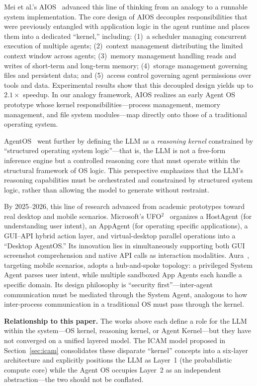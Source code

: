 \documentclass[11pt,a4paper]{article}
\begin{document}
Mei et al.'s AIOS~\cite{mei2024aios} advanced this line of thinking from an analogy to a runnable system implementation.
The core design of AIOS decouples responsibilities that were previously entangled with application logic in the agent runtime and places them into a dedicated ``kernel,'' including:
(1)~a scheduler managing concurrent execution of multiple agents;
(2)~context management distributing the limited context window across agents;
(3)~memory management handling reads and writes of short-term and long-term memory;
(4)~storage management governing files and persistent data; and
(5)~access control governing agent permissions over tools and data.
Experimental results show that this decoupled design yields up to $2.1\times$ speedup.
In our analogy framework, AIOS realizes an early Agent OS prototype whose kernel responsibilities---process management, memory management, and file system modules---map directly onto those of a traditional operating system.

AgentOS~\cite{agentos2025} went further by defining the LLM as a \textit{reasoning kernel} constrained by ``structured operating system logic''---that is, the LLM is not a free-form inference engine but a controlled reasoning core that must operate within the structural framework of OS logic.
This perspective emphasizes that the LLM's reasoning capabilities must be orchestrated and constrained by structured system logic, rather than allowing the model to generate without restraint.

By 2025--2026, this line of research advanced from academic prototypes toward real desktop and mobile scenarios.
Microsoft's UFO$^2$~\cite{ufo2_2025} organizes a HostAgent (for understanding user intent), an AppAgent (for operating specific applications), a GUI--API hybrid action layer, and virtual-desktop parallel operations into a ``Desktop AgentOS.''
Its innovation lies in simultaneously supporting both GUI screenshot comprehension and native API calls as interaction modalities.
Aura~\cite{aura2025}, targeting mobile scenarios, adopts a hub-and-spoke topology: a privileged System Agent parses user intent, while multiple sandboxed App Agents each handle a specific domain.
Its design philosophy is ``security first''---inter-agent communication must be mediated through the System Agent, analogous to how inter-process communication in a traditional OS must pass through the kernel.

\textbf{Relationship to this paper.}
The works above each define a role for the LLM within the system---OS kernel, reasoning kernel, or Agent Kernel---but they have not converged on a unified layered model.
The ICAM model proposed in Section~\ref{sec:icam} consolidates these disparate ``kernel'' concepts into a six-layer architecture and explicitly positions the LLM as Layer~1 (the probabilistic compute core) while the Agent OS occupies Layer~2 as an independent abstraction---the two should not be conflated.
\end{document}
